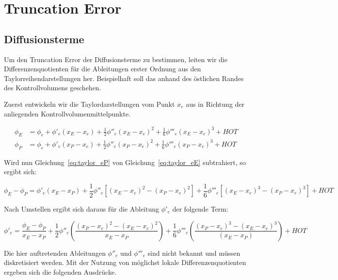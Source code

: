 \documentclass[11pt, ngerman,colorback,accentcolor=tud2d]{tudreport}
\begin{document}
\newcommand{\pder}[2][]{\frac{\partial#1}{\partial#2}}
\newcommand{\pderf}[1]{\frac{\partial f}{\partial#1}}
\newcommand{\pderfs}[1]{\frac{\partial^2 f}{\partial#1}}

\tableofcontents


\chapter{Truncation Error}
\label{cha:Truncation_Error}
\section{Diffusionsterme}
\label{sec:Diffusionsterme}


Um den Truncation Error der Diffusionsterme zu bestimmen, leiten wir die Differenzenquotienten
für die Ableitungen erster Ordnung aus den Taylorreihendarstellungen her. Beispielhaft
soll das anhand des östlichen Randes des Kontrollvolumens geschehen.

Zuerst entwickeln wir die Taylordarstellungen vom Punkt $x_e$ aus in Richtung der anliegenden
Kontrollvolumenmittelpunkte.

\begin{align}
  \phi_E &= \phi_e + \phi'_e(x_E-x_e)+\frac{1}{2}\phi''_e(x_E-x_e)^2
  +\frac{1}{6}\phi'''_e(x_E-x_e)^3+HOT
  \label{eq:taylor_eE}\\
  \phi_P &= \phi_e + \phi'_e(x_P-x_e)+\frac{1}{2}\phi''_e(x_P-x_e)^2
  +\frac{1}{6}\phi'''_e(x_P-x_e)^3+HOT
  \label{eq:taylor_eP}
\end{align}

Wird nun Gleichung~\eqref{eq:taylor_eP} von Gleichung~\eqref{eq:taylor_eE} subtrahiert, 
so ergibt sich:

\begin{equation*}
  \phi_E-\phi_P=\phi'_e(x_E-x_P)+
  \frac{1}{2}\phi''_e\left[{{(x_E-x_e)}^2-{(x_P-x_e)}^2}\right]+
  \frac{1}{6}\phi'''_e\left[{{(x_E-x_e)}^3-{(x_P-x_e)}^3}\right]+HOT
\end{equation*}

Nach Umstellen ergibt sich daraus für die Ableitung $\phi'_e$ der folgende Term:

\begin{equation}
  \phi'_e = \frac{\phi_E-\phi_P}{x_E-x_P}+\frac{1}{2}\phi''_e
\left({\frac{{(x_P-x_e)}^2-{(x_E-x_e)}^2}{x_E-x_P}}\right)+
\frac{1}{6} \phi'''_e \left({\frac{{(x_P-x_e)}^3-{(x_E-x_e)}^3}{(x_E-x_P)}}\right)+HOT
\end{equation}


Die hier auftretenden Ableitungen $\phi''_e$ und $\phi'''_e$ sind nicht bekannt und 
müssen diskretisiert werden. Mit der Nutzung von
möglichst lokale Differenzenquotienten ergeben sich die folgenden Ausdrücke.
\end{document}
